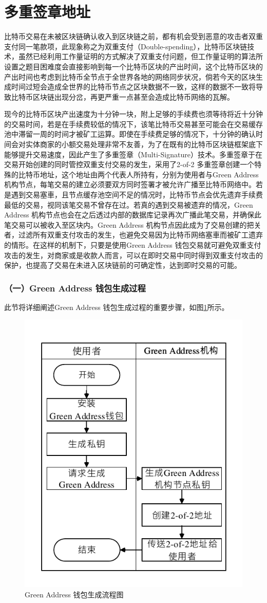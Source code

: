			\section{多重签章地址}

			 	⽐特币交易在未被区块链确认收⼊到区块链之前，都有机会受到恶意的攻击者双重⽀付同⼀笔款项，此现象称之为双重⽀付（Double-spending）\supercite{Informationpropagationinthebitcoinnetwork}\supercite{Double-spendingfastpaymentsinbitcoin}，⽐特币区块链技术，虽然已经利⽤⼯作量证明的⽅式解决了双重⽀付问题，但工作量证明的算法所设置之题目困难度会直接影响到每一个比特币区块的产出时间，这个比特币区块的产出时间也考虑到比特币全节点于全世界各地的网络同步状况，倘若今天的区块生成时间过短会造成全世界的比特币节点之区块数据不一致，这样的数据不一致将导致比特币区块链出现分岔，再更严重一点甚至会造成比特币网络的瓦解。

			 	现今的⽐特币区块产出速度为⼗分钟⼀块，附上⾜够的⼿续费也须等待将近⼗分钟的交易时间，若是在⼿续费较低的情况下，该笔⽐特币交易甚⾄可能会在交易缓存池中滞留⼀周的时间才被矿工运算。即使在⼿续费⾜够的情况下，⼗分钟的确认时间会对实体商家的⼩额交易处理⾮常不友善，为了在既有的⽐特币区块链框架底下能够提升交易速度，因此产生了多重签章（Multi-Signature）技术。多重签章于在交易开始创建的同时管控双重⽀付交易的发⽣，采⽤了2-of-2 多重签章创建⼀个特殊的⽐特币地址，这个地址由两个代表⼈所持有，分别为使⽤者与Green Address\supercite{GreenAddress}机构节点，每笔交易的建⽴必须要双⽅同时签署才被允许广播⾄⽐特币网络中。若是遇到交易塞⾞，且节点缓存池空间不⾜的情况时，⽐特币节点会优先遗弃⼿续费最低的交易，视同该笔交易不曾存在过。若真的遇到交易被遗弃的情况，Green Address 机构节点也会在之后透过内部的数据库记录再次广播此笔交易，并确保此笔交易可以被收⼊⾄区块内。Green Address 机构节点因此成为了交易创建的把关者，过滤所有双重⽀付攻击的发⽣，也避免交易因为⽐特币网络塞⾞⽽被矿⼯遗弃的情形。在这样的机制下，只要是使⽤Green Address 钱包交易就可避免双重⽀付攻击的发⽣，对商家或是收款⼈⽽⾔，可以在即时交易中同时得到双重⽀付攻击的保护，也提高了交易在未进⼊区块链前的可确定性，达到即时交易的可能。

			 	\subsubsection{（一）Green Address 钱包生成过程}
			 	此节将详细阐述Green Address 钱包生成过程的重要步骤，如图\ref{gabuild}所示。
			 	\begin{figure}[!htb]
					\centering
					\includegraphics[width = .4\textwidth]{gabuild.pdf}
					\caption{Green Address 钱包生成流程图}\label{gabuild}
				\end{figure}

